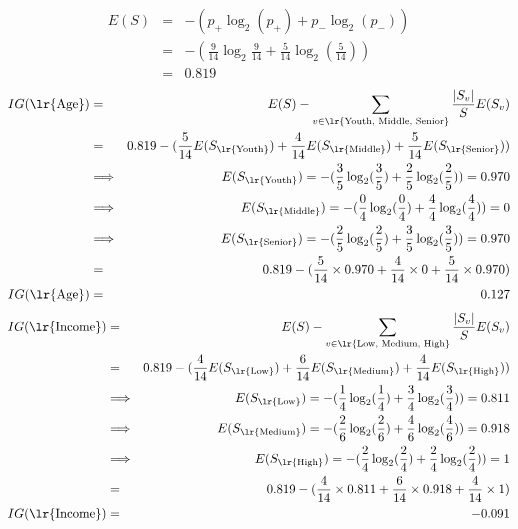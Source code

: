 \documentclass{article}
\begin{document}
\begin{eqnarray*}
    E(S) & = & -(p_{+} \log_2(p_{+}) + p_{-} \log_2(p_{-})) \\
    & = & - (\frac{9}{14} \log_2{\frac{9}{14}} + \frac{5}{14} \log_2(\frac{5}{14})) \\
    & = & 0.819
\end{eqnarray*}
\begin{eqnarray*}
    IG(\text{\lr{Age}}) & = & E(S) - \sum_{v \in {\text{\lr{Youth, Middle, Senior}}}} \frac{|S_v|}{S} E(S_v) \\
    & = & 0.819 - (\frac{5}{14} E(S_{\text{\lr{Youth}}}) + \frac{4}{14} E(S_{\text{\lr{Middle}}}) + \frac{5}{14} E(S_{\text{\lr{Senior}}}))\\
    & \Longrightarrow & E(S_{\text{\lr{Youth}}}) = -(\frac{3}{5} \log_2(\frac{3}{5}) + \frac{2}{5} \log_2(\frac{2}{5})) = 0.970 \\
    & \Longrightarrow & E(S_{\text{\lr{Middle}}}) = -(\frac{0}{4} \log_2(\frac{0}{4}) + \frac{4}{4} \log_2(\frac{4}{4})) = 0 \\
    & \Longrightarrow & E(S_{\text{\lr{Senior}}}) = -(\frac{2}{5} \log_2(\frac{2}{5}) + \frac{3}{5} \log_2(\frac{3}{5})) = 0.970 \\
    & = & 0.819 - (\frac{5}{14} \times 0.970 + \frac{4}{14} \times 0 + \frac{5}{14} \times 0.970) \\
    IG(\text{\lr{Age}}) & = & 0.127
\end{eqnarray*}
\begin{eqnarray*}
    IG(\text{\lr{Income}}) & = & E(S) - \sum_{v \in {\text{\lr{Low, Medium, High}}}} \frac{|S_v|}{S} E(S_v) \\
    & = & 0.819 - (\frac{4}{14} E(S_{\text{\lr{Low}}}) + \frac{6}{14} E(S_{\text{\lr{Medium}}}) + \frac{4}{14} E(S_{\text{\lr{High}}}))\\
    & \Longrightarrow & E(S_{\text{\lr{Low}}}) = -(\frac{1}{4} \log_2(\frac{1}{4}) + \frac{3}{4} \log_2(\frac{3}{4})) = 0.811 \\
    & \Longrightarrow & E(S_{\text{\lr{Medium}}}) = -(\frac{2}{6} \log_2(\frac{2}{6}) + \frac{4}{6} \log_2(\frac{4}{6})) = 0.918 \\
    & \Longrightarrow & E(S_{\text{\lr{High}}}) = -(\frac{2}{4} \log_2(\frac{2}{4}) + \frac{2}{4} \log_2(\frac{2}{4})) = 1 \\
    & = & 0.819 - (\frac{4}{14} \times 0.811 + \frac{6}{14} \times 0.918 + \frac{4}{14} \times 1 )\\
    IG(\text{\lr{Income}}) & = & -0.091
\end{eqnarray*}
\end{document}
